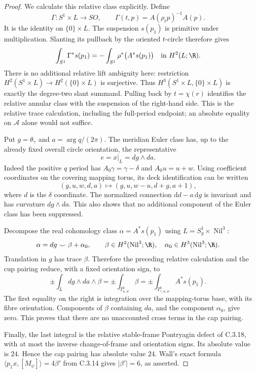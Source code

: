 \begin{proof}
We calculate this relative class explicitly. Define
\[
 \Gamma:S^1\times L\longrightarrow SO,
 \qquad\Gamma(t,p)=A(\rho_t p)^{-1}A(p).
\]
It is the identity on $\{0\}\times L$. The suspension
$s(p_1)$ is primitive under multiplication. Slanting its
pullback by the oriented $t$-circle therefore gives
\[
 \int_{S^1}\Gamma^*s(p_1)
 =-\int_{S^1}\rho^*\bigl(A^*s(p_1)\bigr)
 \quad\hbox{in }H^2(L;\R).
\]
There is no additional relative lift ambiguity here:
restriction $H^2(S^1\times L)\to H^2(\{0\}\times L)$
is surjective. Thus $H^3(S^1\times L,\{0\}\times L)$
is exactly the degree-two slant summand. Pulling back by
$t=\chi(r)$ identifies the relative annular class with
the suspension of the right-hand side. This is the
relative trace calculation, including the full-period
endpoint; an absolute equality on $\mathcal A$ alone
would not suffice.

Put $g=\theta_\gamma$ and $a=\arg q/(2\pi)$. The meridian
Euler class has, up to the already fixed overall circle
orientation, the representative
\[
 e=x|_L=dg\wedge da.
\]
Indeed the positive $q$ period has
$A_0\gamma=\gamma-\delta$ and $A_0u=u+w$.
Using coefficient coordinates on the covering mapping
torus, its deck identification can be written
\[
 (g,u,w,d,a)\longmapsto(g,u,w-u,d+g,a+1),
\]
where $d$ is the $\delta$ coordinate. The normalized
connection $\mathrm d d-a\,\mathrm d g$ is invariant and has curvature
$dg\wedge da$. This also shows that no additional
component of the Euler class has been suppressed.

Decompose the real cohomology class
$\alpha=A^*s(p_1)$ using $L=S^1_g\times\operatorname{Nil}^3$:
\[
 \alpha=dg\smile\beta+\alpha_0,
 \qquad\beta\in H^2(\operatorname{Nil}^3;\R),\quad
 \alpha_0\in H^3(\operatorname{Nil}^3;\R).
\]
Translation in $g$ has trace $\beta$. Therefore the preceding
relative calculation and the cup pairing reduce, with a
fixed orientation sign, to
\[
 \pm\int_L dg\wedge da\wedge\beta
 =\pm\int_{T^2_{u,w}}\beta
 =\pm\int_{T^3_{\gamma,u,w}}A^*s(p_1).
\]
The first equality on the right is integration over the
mapping-torus base, with its fibre orientation. Components
of $\beta$ containing $da$, and the component $\alpha_0$,
give zero. This proves that there are no unaccounted
cross terms in the cap pairing.

Finally, the last integral is the relative stable-frame
Pontryagin defect of C.3.18, with at most the inverse
change-of-frame and orientation signs. Its absolute value
is $24$. Hence the cap pairing has absolute value $24$.
Wall's exact formula $\langle p_1x,[M_\psi]\rangle=4\beta'$
from C.3.14 gives $|\beta'|=6$, as asserted.
\end{proof}

